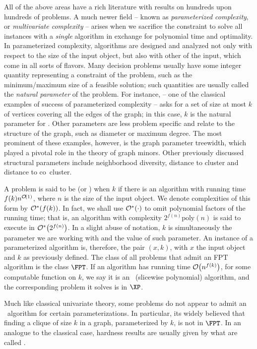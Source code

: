 All of the above areas have a rich literature with results on hundreds upon hundreds of problems.
A much newer field -- known as \textit{parameterized complexity}, or \textit{multivariate complexity} -- arises when we sacrifice the constraint to solve all instances with a \textit{single} algorithm in exchange for polynomial time and optimality.
In parameterized complexity, algorithms are designed and analyzed not only with respect to the size of the input object, but also with other  of the input, which come in all sorts of flavors.
Many decision problems usually have some integer quantity representing a constraint of the problem, such as the minimum/maximum size of a feasible solution; such quantities are usually called the \textit{natural parameter} of the problem.
For instance,  -- one of the classical examples of success of parameterized complexity -- asks for a set of size at most $k$ of vertices covering all the edges of the graph; in this case, $k$ is the natural parameter for .
Other parameters are less problem specific and relate to the structure of the graph, such as diameter or maximum degree.
The most prominent of these examples, however, is the graph parameter treewidth, which played a pivotal role in the theory of graph minors.
Other previously discussed structural parameters include neighborhood diversity, distance to cluster and distance to co~cluster.

A problem is said to be  (or \FPT) when  $k$ if there is an algorithm with running time $f(k)n^{\mathcal{O}\!\left(1\right)}$, where $n$ is the size of the input object.
We denote complexities of this form by $\mathcal{O}^*\!\left(f(k)\right)$.
In fact, we shall use $\mathcal{O}^*\!\left(\cdot\right)$ to omit polynomial factors of the running time; that is, an algorithm with complexity $2^{f(n)}\text{poly}(n)$ is said to execute in $\mathcal{O}^*\!\left(2^{f(n)}\right)$.
In a slight abuse of notation, $k$ is simultaneously the parameter we are working with and the value of such parameter.
An instance of a parameterized algorithm is, therefore, the pair $(x,k)$, with $x$ the input object and $k$ as previously defined.
The class of all problems that admit an FPT algorithm is the class $\FPT$.
If an algorithm has running time $\mathcal{O}\!\left(n^{f(k)}\right)$, for some computable function on $k$,  we say it is an \XP\ (slicewise polynomial) algorithm, and the corresponding problem it solves is in $\XP$. 

Much like classical univariate theory, some problems do not appear to admit an \FPT\ algorithm for certain parameterizations. In particular, its widely believed that finding a clique of size $k$ in a graph, parameterized by $k$, is not in $\FPT$.
In an analogue to the classical case, hardness results are usually given by what are called .


